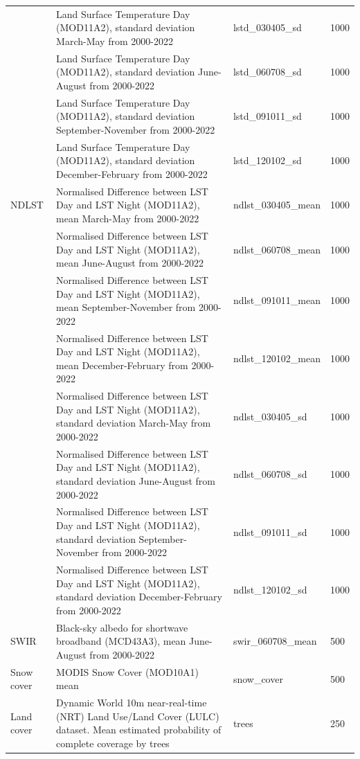 \documentclass[
  10pt,
  b5paper,
  oneside]{book}
\begin{document}
\begin{longtable}{p{}  p{} p{} p{}}
        & Land Surface Temperature Day (MOD11A2), standard deviation March-May from 2000-2022 & lstd\_030405\_sd & 1000 \\
        & Land Surface Temperature Day (MOD11A2), standard deviation June-August from 2000-2022 & lstd\_060708\_sd & 1000 \\
        & Land Surface Temperature Day (MOD11A2), standard deviation September-November from 2000-2022 & lstd\_091011\_sd & 1000 \\
        & Land Surface Temperature Day (MOD11A2), standard deviation December-February from 2000-2022 & lstd\_120102\_sd & 1000 \\ 
        \hline
        NDLST & Normalised Difference between LST Day and LST Night (MOD11A2), mean March-May from 2000-2022 & ndlst\_030405\_mean & 1000 \\
        & Normalised Difference between LST Day and LST Night (MOD11A2), mean June-August from 2000-2022 & ndlst\_060708\_mean & 1000 \\
        & Normalised Difference between LST Day and LST Night (MOD11A2), mean September-November from 2000-2022 & ndlst\_091011\_mean & 1000 \\
        & Normalised Difference between LST Day and LST Night (MOD11A2), mean December-February from 2000-2022 & ndlst\_120102\_mean & 1000 \\
        & Normalised Difference between LST Day and LST Night (MOD11A2), standard deviation March-May from 2000-2022 & ndlst\_030405\_sd & 1000 \\
        & Normalised Difference between LST Day and LST Night (MOD11A2), standard deviation June-August from 2000-2022 & ndlst\_060708\_sd & 1000 \\
        & Normalised Difference between LST Day and LST Night (MOD11A2), standard deviation September-November from 2000-2022 & ndlst\_091011\_sd & 1000 \\
        & Normalised Difference between LST Day and LST Night (MOD11A2), standard deviation December-February from 2000-2022 & ndlst\_120102\_sd & 1000 \\ 
        \hline
        SWIR & Black-sky albedo for shortwave broadband (MCD43A3), mean June-August from 2000-2022 & swir\_060708\_mean & 500 \\ 
        \hline
        Snow cover & MODIS Snow Cover (MOD10A1) mean & snow\_cover & 500 \\ 
        \hline
        Land cover & Dynamic World 10m near-real-time (NRT) Land Use/Land Cover (LULC) dataset. Mean estimated probability of complete coverage by trees & trees & 250 \\

\end{longtable}
\end{document}

